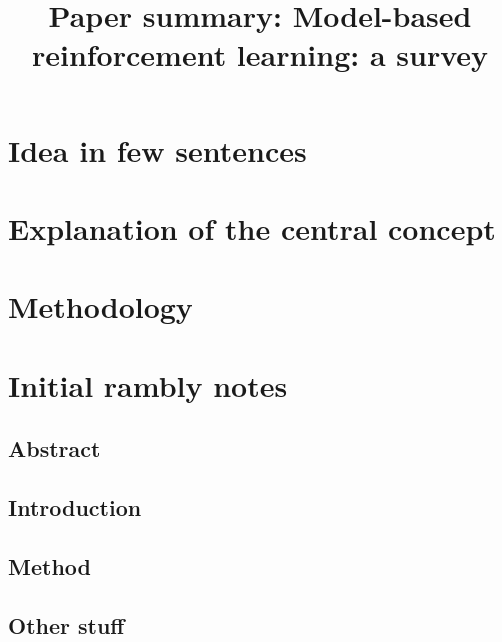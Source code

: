 \documentclass{article}
\title{Paper summary: Model-based reinforcement learning: a survey}
\begin{document}
\maketitle


\section{Idea in few sentences}



\section{Explanation of the central concept}




\section{Methodology}


\section{Initial rambly notes}


\subsection{Abstract}


\subsection{Introduction}


\subsection{Method}

\subsection{Other stuff}
\end{document}
